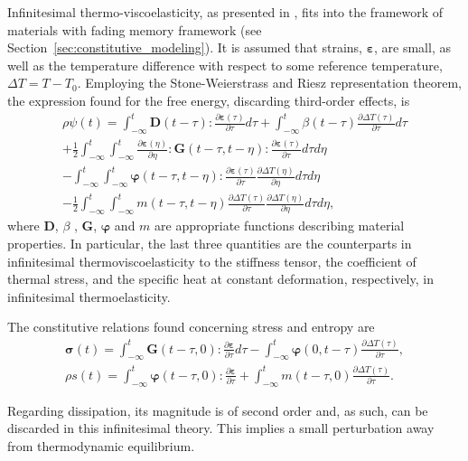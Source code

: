 Infinitesimal thermo-viscoelasticity, as presented in \cite{christensen2013theory}, fits into the framework of materials with fading memory framework (see Section~\ref{sec:constitutive_modeling}).
It is assumed that strains, $\bm \varepsilon$, are small, as well as the temperature difference with respect to some reference temperature, $\Delta T=T-T_0$.
Employing the Stone-Weierstrass and Riesz representation theorem, the expression found for the free energy, discarding third-order effects, is
\begin{multline}
  \rho\psi(t) = \int_{-\infty}^t \bm D(t-\tau):\frac{\partial \bm\varepsilon(\tau)}{\partial \tau}d\tau + \int_{-\infty}^t \beta(t-\tau)\frac{\partial \Delta T(\tau)}{\partial \tau}d\tau\\ + \frac{1}{2}\int_{-\infty}^t\int_{-\infty}^t \frac{\partial \bm\varepsilon(\eta)}{\partial \eta}:\bm G(t-\tau, t-\eta):\frac{\partial \bm \varepsilon(\tau)}{\partial \tau}d\tau d\eta  \\
  -\int_{-\infty}^t \int_{-\infty}^t \bm\varphi(t-\tau, t-\eta):\frac{\partial \bm\varepsilon(\tau)}{\partial \tau} \frac{\partial \Delta T(\eta)}{\partial \eta} d \tau d \eta\\
  -\frac{1}{2} \int_{-\infty}^t \int_{-\infty}^t m(t-\tau, t-\eta) \frac{\partial \Delta T(\tau)}{\partial \tau} \frac{\partial \Delta T(\eta)}{\partial \eta} d \tau d \eta,
  \end{multline}
where $\bm D$, $\beta$ , $\bm G$, $\bm \varphi$ and $m$ are appropriate functions describing  material properties.
In particular, the last three quantities are the counterparts in infinitesimal thermoviscoelasticity to the stiffness tensor, the coefficient of thermal stress, and the specific heat at constant deformation, respectively, in infinitesimal thermoelasticity.

The constitutive relations found concerning stress and entropy are
\begin{gather}
  \bm \sigma(t) = \int_{-\infty}^t \bm G(t-\tau, 0):\frac{\partial\bm\varepsilon}{\partial \tau} d\tau-\int_{-\infty}^t \bm\varphi(0, t-\tau)\frac{\partial \Delta T(\tau)}{\partial \tau},\\
  \rho s(t) = \int_{-\infty}^t \bm\varphi(t-\tau, 0):\frac{\partial \bm \varepsilon}{\partial \tau} + \int_{-\infty}^t m(t-\tau, 0)\frac{\partial \Delta T(\tau)}{\partial \tau}.
\end{gather}

Regarding dissipation, its magnitude is of second order and, as such, can be discarded in this infinitesimal theory.
This implies a small perturbation away from thermodynamic equilibrium.

